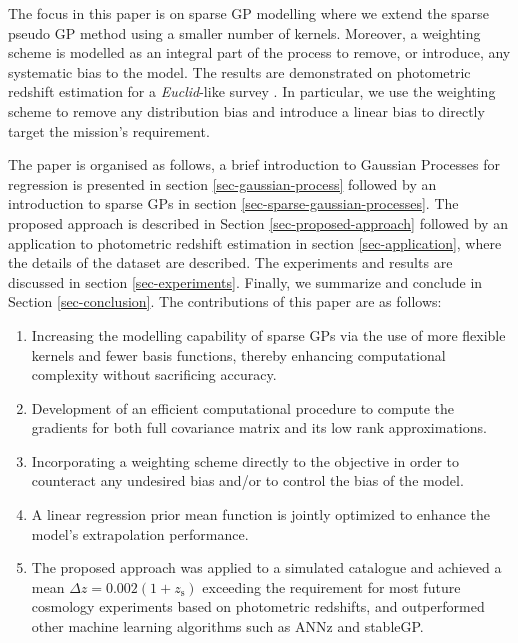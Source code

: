 \documentclass[useAMS,usenatbib,fleqn]{mn2e}
\begin{document}
The focus in this paper is on sparse GP modelling where we extend the sparse pseudo GP method using a smaller number of kernels. Moreover, a weighting scheme is modelled as an integral part of the process to remove, or introduce, any systematic bias to the model. The results are demonstrated on photometric redshift estimation for a {\em Euclid}-like survey \citep{laureijs2011}. In particular, we use the weighting scheme to remove any distribution bias and introduce a linear bias to directly target the mission's requirement. 

The paper is organised as follows, a brief introduction to Gaussian Processes for regression is presented in section \ref{sec-gaussian-process} followed by an introduction to sparse GPs in section \ref{sec-sparse-gaussian-processes}. The proposed approach is described in Section \ref{sec-proposed-approach} followed by an application to photometric redshift estimation in section \ref{sec-application}, where the details of the dataset are described. The experiments and results are discussed in section \ref{sec-experiments}. Finally, we summarize and conclude in Section \ref{sec-conclusion}. The contributions of this paper are as follows:
\begin{enumerate}
  \item Increasing the modelling capability of sparse GPs via the use of more flexible kernels and fewer basis functions, thereby enhancing computational complexity without sacrificing accuracy.
  \item Development of an efficient computational procedure to compute the gradients for both full covariance matrix and its low rank approximations.
  \item Incorporating a weighting scheme directly to the objective in order to counteract any undesired bias and/or to control the bias of the model. 
  \item A linear regression prior mean function is jointly optimized to enhance the model's extrapolation performance.
  \item The proposed approach was applied to a simulated catalogue and achieved  a mean $\Delta z = 0.002(1+z_\textrm{s})$ exceeding the requirement for most future cosmology experiments based on photometric redshifts, and outperformed other machine learning algorithms such as ANNz and stableGP.
\end{enumerate}
\end{document}
